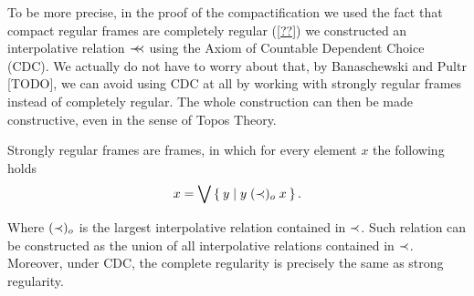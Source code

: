 To be more precise, in the proof of the compactification we used the fact that compact regular frames are completely regular (\ref{??}) we constructed an interpolative relation $\prec\mkern-7mu\prec$ using the Axiom of Countable Dependent Choice (CDC). We actually do not have to worry about that, by Banaschewski and Pultr [TODO], we can avoid using CDC at all by working with strongly regular frames instead of completely regular. The whole construction can then be made constructive, even in the sense of Topos Theory.

Strongly regular frames are frames, in which for every element $x$ the following holds
$$ x = \bigvee \Set{ y | y\;(\prec)_o\;x }. $$

Where $(\prec)_o$ is the largest interpolative relation contained in $\prec$. Such relation can be constructed as the union of all interpolative relations contained in $\prec$. Moreover, under CDC, the complete regularity is precisely the same as strong regularity.

